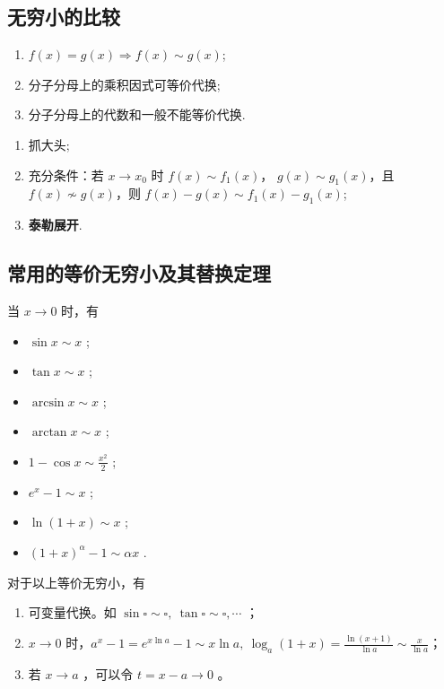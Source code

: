 \subsection{无穷小的比较}
\begin{enumerate}
    \item $
    f(x)=g(x)\Rightarrow f(x)\sim g(x)
    $;
    \item 分子分母上的乘积因式可等价代换;
    \item 分子分母上的代数和一般不能等价代换.
\end{enumerate}

\begin{Field}[代数和求等价]
\begin{enumerate}
    \item 抓大头;
    \item 充分条件：若 $ x\rightarrow x_0 $ 时 $ f(x)\sim f_1(x) $，
    $ g(x)\sim g_1(x) $，且$ f(x)\nsim g(x) $，则 $ f(x)-g(x)\sim f_1(x)-g_1(x) $;
    \item \textbf{泰勒展开}.    
\end{enumerate}
\end{Field}

\subsection{常用的等价无穷小及其替换定理}

当 $ x\rightarrow0 $ 时，有

\begin{itemize}
    \item $ \sin x\sim x $ ;
    \item $ \tan x \sim x $ ;
    \item $ \arcsin x \sim x $ ;
    \item $ \arctan x \sim x $ ;
    \item $ 1-\cos x\sim \frac{x^2}{2} $ ;
    \item $ e^x-1\sim x $ ;
    \item $ \ln(1+x)\sim x $ ;
    \item $ (1+x)^{\alpha}-1\sim \alpha x  $ .
\end{itemize}

对于以上等价无穷小，有

\begin{enumerate}
    \item 可变量代换。如 $ \sin \square \sim \square,\ \tan \square \sim \square,\cdots $ ；
    \item $ x\rightarrow0 $ 时，$ a^x-1=e^{x\ln a} -1\sim x\ln a,\ \log_a(1+x)=\frac{\ln(x+1)}{\ln a}\sim \frac{x}{\ln a}$；
    \item 若 $ x\rightarrow a $ ，可以令 $ t = x - a \rightarrow 0 $ 。
\end{enumerate}

